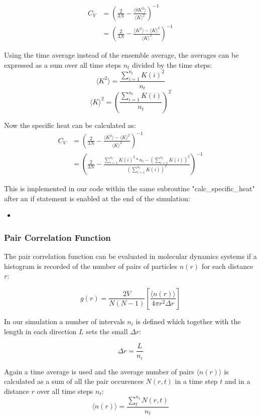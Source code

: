 \documentclass[
10pt, %
a4paper, %
oneside, %
headinclude,footinclude, %
BCOR5mm, %
]{scrartcl}
\newcommand{\insertcode}[2]{\begin{itemize}\item[]\end{itemize}} %
\begin{document}
\begin{align}
C_V &= \left (\frac{2}{3N} - \frac{\langle\delta K^2\rangle}{\langle K\rangle^2}\right)^{-1} \\
&= \left (\frac{2}{3N} - \frac{\langle K^2 \rangle - \langle K \rangle^2}{\langle K\rangle^2} \right )^{-1} 
\end{align}


\noindent
Using the time average instead of the ensemble average, the averages can be expressed as a sum over all time steps $n_t$ divided by the time steps:
$$ \langle K^2 \rangle  = \frac{\sum_{i=1}^{n_t} K(i)^2}{n_t} $$
$$ \langle K \rangle^2  = \left ( \frac{\sum_{i=1}^{n_t} K(i)  }{n_t} \right)^2 $$

\noindent
Now the specific heat can be calculated as:
\begin{align}
C_V &= \left (\frac{2}{3N} - \frac{\langle K^2 \rangle - \langle K \rangle^2}{\langle K\rangle^2} \right )^{-1} \\
&= \left ( \frac{2}{3N} - \frac{\sum_{i=1}^{n_t} K(i)^2*n_t - \left (\sum_{i=1}^{n_t} K(i) \right )^2 }{\left (\sum_{i=1}^{n_t} K(i) \right )^2 } \right )^{-1}
\end{align}

This is implemented in our code within the same subroutine "calc\_specific\_heat" after an if statement is enabled at the end of the simulation:
\insertcode{"Scripts/specific_heat_snippet_2.f90"}{Calculating the specific heat} %


\subsubsection{Pair Correlation Function}

The pair correlation function can be evaluated in molecular dynamics systems  if a histogram is recorded of the number of pairs of particles $n(r)$ for each distance $r$:

$$ g(r) = \frac{2V}{N(N-1)} \left [ \frac{\langle n(r) \rangle }{ 4 \pi r^2 \Delta r} \right ] $$

\noindent
In our simulation a number of intervals $n_i$ is defined which together with the length in each direction $L$ sets the small $\Delta r$:

$$ \Delta r  = \frac{L}{n_i} $$

\noindent
Again a time average is used and the average number of pairs $\langle n(r) \rangle $ is calculated as a sum of all the pair occurences $N(r,t)$ in a time step $t$ and in a distance $r$ over all time steps $n_t$:
$$ \langle n(r) \rangle = \frac{\sum_t^{n_t} N(r,t)}{n_t} $$
\end{document}
